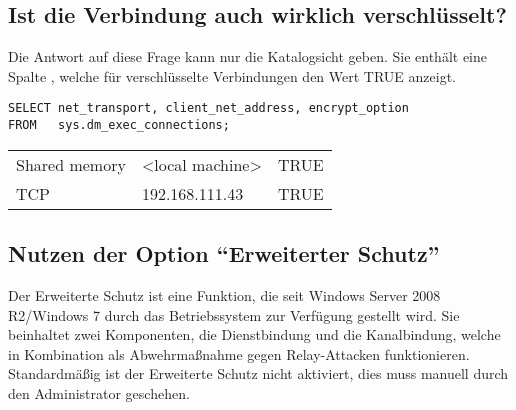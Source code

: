       \subsection{Ist die Verbindung auch wirklich verschlüsselt?}
        Die Antwort auf diese Frage kann nur die Katalogsicht
         geben. Sie enthält eine Spalte
        , welche für verschlüsselte Verbindungen den
        Wert TRUE anzeigt.
        \begin{lstlisting}[language=ms_sql,caption={Verschlüsselungseigenschaften
        der Verbindung abfragen},label=sql19_01]
SELECT net_transport, client_net_address, encrypt_option
FROM   sys.dm_exec_connections;
        \end{lstlisting}
        \begin{center}
          \begin{small}
            \tablehead{}
            \begin{mssql}
              \begin{supertabular}{lll}
                Shared memory & <local machine> & TRUE \\
                TCP & 192.168.111.43 & TRUE \\
              \end{supertabular}
            \end{mssql}
          \end{small}
        \end{center}
        
      \subsection{Nutzen der Option \enquote{Erweiterter Schutz}}
        Der Erweiterte Schutz ist eine Funktion, die seit Windows Server 2008
        R2/Windows 7 durch das Betriebssystem zur Verfügung gestellt wird. Sie
        beinhaltet zwei Komponenten, die Dienstbindung und die Kanalbindung,
        welche in Kombination als Abwehrmaßnahme gegen Relay-Attacken
        funktionieren. Standardmäßig ist der Erweiterte Schutz nicht aktiviert,
        dies muss manuell durch den Administrator geschehen.
